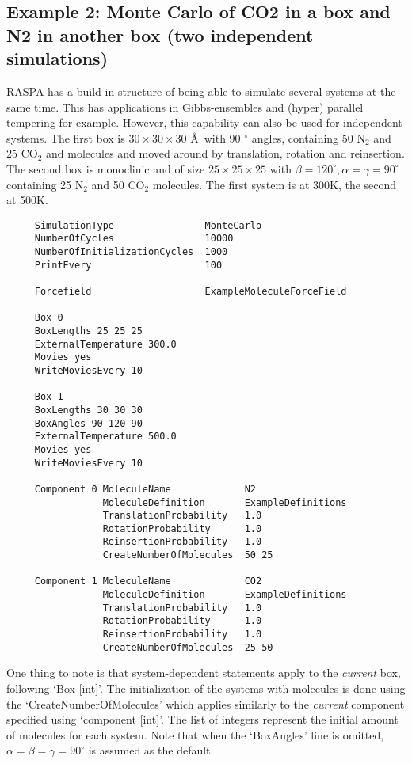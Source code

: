 \subsection*{Example 2: Monte Carlo of CO2 in a box and N2 in another box (two independent simulations)}

RASPA has a build-in structure of being able to simulate several systems at the same time. This has applications in Gibbs-ensembles and (hyper) parallel tempering
for example. However, this capability can also be used for independent systems. The first box is $30\times30\times30$ \AA\ with 90 $^\circ$ angles,
containing 50 N$_2$ and 25 CO$_2$ and molecules and moved around by translation, rotation and reinsertion. The second box is monoclinic
and of size $25\times25\times25$ with
$\beta=120^\circ,\alpha=\gamma=90^\circ$ containing 25 N$_2$ and 50 CO$_2$ molecules. The first system is at 300K, the second at 500K.

\begin{tiny}
\begin{verbatim}
     SimulationType                MonteCarlo
     NumberOfCycles                10000
     NumberOfInitializationCycles  1000
     PrintEvery                    100

     Forcefield                    ExampleMoleculeForceField

     Box 0
     BoxLengths 25 25 25
     ExternalTemperature 300.0
     Movies yes
     WriteMoviesEvery 10

     Box 1
     BoxLengths 30 30 30
     BoxAngles 90 120 90
     ExternalTemperature 500.0
     Movies yes
     WriteMoviesEvery 10

     Component 0 MoleculeName             N2
                 MoleculeDefinition       ExampleDefinitions
                 TranslationProbability   1.0
                 RotationProbability      1.0
                 ReinsertionProbability   1.0
                 CreateNumberOfMolecules  50 25

     Component 1 MoleculeName             CO2
                 MoleculeDefinition       ExampleDefinitions
                 TranslationProbability   1.0
                 RotationProbability      1.0
                 ReinsertionProbability   1.0
                 CreateNumberOfMolecules  25 50
\end{verbatim}
\end{tiny}
One thing to note is that system-dependent statements apply to the \emph{current} box, following `Box [int]'. The initialization
of the systems with molecules is done using the `CreateNumberOfMolecules' which applies similarly to the \emph{current} component
specified using `component [int]'. The list of integers represent the initial amount of molecules for each system. Note that when the
`BoxAngles' line is omitted, $\alpha=\beta=\gamma=90^\circ$ is assumed as the default.

